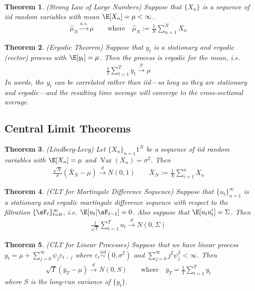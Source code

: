 \documentclass[12pt]{article}
\theoremstyle{plain}
\newtheorem{thm}{Theorem}[section]
\theoremstyle{definition}
\theoremstyle{remark}
\newcommand{\iid}{\overset{iid}{\sim}}
\newcommand{\Var}{\operatorname{Var}}
\newcommand{\asto}{\xrightarrow{a.s.}}
\newcommand{\pto}{\xrightarrow{p}}
\newcommand{\dto}{\xrightarrow{d}}
\newcommand{\sumnN}{\sum^N_{n=1}}
\newcommand{\sumin}{\sum^n_{i=1}}
\newcommand{\sumtT}{\sum^T_{t=1}}
\newcommand{\ninf}{_{n=1}^\infty}
\newcommand{\tinfz}{_{t=0}^\infty}
\begin{document}
\begin{thm}\emph{(Strong Law of Large Numbers)}
Suppose that $\{X_n\}$ is a sequence of iid random variables with mean
$\E[X_n]=\mu<\infty$.
\begin{align*}
  \hat{\mu}_N \asto \mu
  \qquad\text{where} \quad
  \hat{\mu}_N := \frac{1}{N} \sumnN X_n
\end{align*}
\end{thm}

\begin{thm}\emph{(Ergodic Theorem)}
Suppose that $y_t$ is a stationary and ergodic (vector) process with
$\E[y_t]=\mu$. Then the process is ergodic for the mean, i.e.
\begin{align*}
  \frac{1}{T}\sumtT y_t \pto \mu
\end{align*}
In words, the $y_t$ can be correlated rather than iid---so long as they
are stationary and ergodic---and the resulting time average will
converge to the cross-sectional average.
\end{thm}


\clearpage
\subsection{Central Limit Theorems}

\begin{thm}\emph{(Lindberg-Levy)}
Let $\{X_n\}_{n=1}1^N$ be a sequence of iid random variables with
$\E[X_n] = \mu$ and $\Var(X_n)=\sigma^2$. Then
\begin{align*}
  \frac{\sqrt{N}}{\sigma}
  \left(\bar{X}_N - \mu\right) \dto N(0,1)
  \qquad
  \bar{X}_N := \frac{1}{N}\sumin X_n
\end{align*}
\end{thm}

\begin{thm}\emph{(CLT for Martingale Difference Sequence)}
Suppose that $\{u_t\}\ninf$ is a stationary and ergodic martingale
difference sequence with respect to the filtration $\{\sF_t\}\tinfz$,
i.e. $\E[u_t|\sF_{t-1}]=0$. Also suppose that $\E[u_tu_t']=\Sigma$. Then
\begin{align*}
  \frac{1}{\sqrt{T}}\sumtT u_t \dto N(0,\Sigma)
\end{align*}
\end{thm}

\begin{thm}\emph{(CLT for Linear Processes)}
Suppose that we have linear process $y_t=\mu+\sum_{j=0}^\infty \psi_j
\varepsilon_{t-j}$ where $\varepsilon_t\iid (0,\sigma^2)$ and
$\sum_{j=0}^\infty j^2\psi_j^2<\infty$. Then
\begin{align*}
  \sqrt{T}\left(
  \bar{y}_T
  - \mu
  \right)
  \dto N\left(0,S\right)
  \qquad
  \text{where}\quad
  \bar{y}_T =
  \frac{1}{T}
  \sumtT y_t
\end{align*}
where $S$ is the long-run variance of $\{y_t\}$.
\end{thm}
\end{document}
